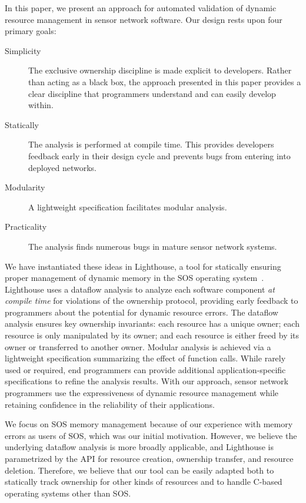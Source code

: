In this paper, we present an approach for automated validation of dynamic
resource management in sensor network software.  
%
Our design rests upon four primary goals:
%
\begin{description}
%
\item[Simplicity]  The exclusive ownership discipline is made explicit to
developers.
%
Rather than acting as a black box, the approach presented in this paper
provides a clear discipline that programmers understand and can easily
develop within.
%
\item[Statically] The analysis is performed at compile time.  This provides
developers feedback early in their design cycle and prevents bugs from
entering into deployed networks.
%
\item[Modularity]  A lightweight specification facilitates modular analysis.
%
\item[Practicality] The analysis finds numerous bugs in mature sensor
network systems.
%
\end{description}



We have instantiated these ideas in Lighthouse, a tool for statically
ensuring proper management of dynamic memory in the SOS operating
system~\cite{sos}.  
%
Lighthouse uses a dataflow analysis to analyze each software component {\em
at compile time} for violations of the ownership protocol, providing early
feedback to programmers about the potential for dynamic resource errors.  
%
The dataflow analysis ensures key ownership invariants:  each resource has a
unique owner; each resource is only manipulated by its owner; and each
resource is either freed by its owner or transferred to another owner.  
%
Modular analysis is achieved via a lightweight specification summarizing the
effect of function calls.
%
While rarely used or required, end programmers can provide additional
application-specific specifications to refine the analysis results.
%
With our approach, sensor network programmers use the expressiveness of
dynamic resource management while retaining confidence in the reliability of
their applications.



We focus on SOS memory management because of our experience with memory
errors as users of SOS, which was our initial motivation.  
%
However, we believe the underlying dataflow analysis is more broadly
applicable, and Lighthouse is parametrized by the API for resource creation,
ownership transfer, and resource deletion.  
%
Therefore, we believe that our tool can be easily adapted both to statically
track ownership for other kinds of resources and to handle C-based operating
systems other than SOS.



